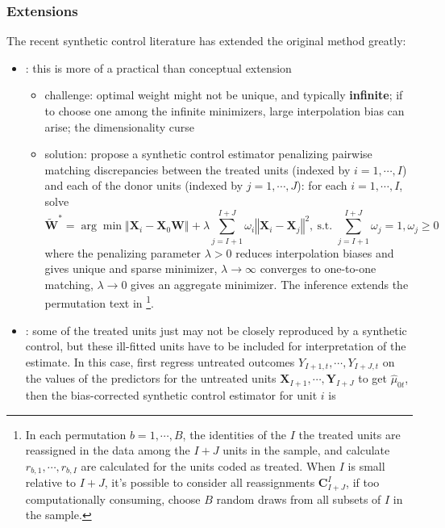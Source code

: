\documentclass[twoside]{article}
\begin{document}
\subsubsection{Extensions}
The recent synthetic control literature has extended the original method greatly:
\begin{itemize}
    \item {}: this is more of a practical than conceptual extension
    \begin{itemize}
        \item challenge: optimal weight might not be unique, and typically \textbf{infinite}; if to choose one among the infinite minimizers, large interpolation bias can arise; the dimensionality curse 
        \item solution: \citet{abadie2021penalized} propose a synthetic control estimator penalizing pairwise matching discrepancies between the treated units (indexed by $i=1,\cdots,I$) and each of the donor units (indexed by $j=1,\cdots,J$): for each $i=1,\cdots,I$, solve $$ \tilde{\mathbf{W}}^* = \arg\min \left\Vert \mathbf{X}_i-\mathbf{X}_0\mathbf{W} \right\Vert +\lambda \sum^{I+J}_{j=I+1}\omega_i\left\Vert \mathbf{X}_i - \mathbf{X}_j \right\Vert ^2 ,\ \text{s.t. }  \sum^{I+J}_{j=I+1}\omega_j =1,\omega_j\geq 0 $$
        where the penalizing parameter $\lambda>0$ reduces interpolation biases and gives unique and sparse minimizer, $\lambda \rightarrow \infty$ converges to one-to-one matching, $\lambda\rightarrow 0$ gives an aggregate minimizer. The inference extends the permutation text in \citet{abadie2010synthetic}\footnote{In each permutation $b=1,\cdots,B$, the identities of the $I$ the treated units are reassigned in the data among the $I+J$ units in the sample, and calculate $r_{b,1},\cdots,r_{b,I}$ are calculated for the units coded as treated. When $I$ is small relative to $I+J$, it's possible to consider all reassignments $\mathbf{C}^I_{I+J}$, if too computationally consuming, choose $B$ random draws from all subsets of $I$ in the sample.}.
    \end{itemize}
    \item {}: some of the treated units just may not be closely reproduced by a synthetic control, but these ill-fitted units have to be included for interpretation of the estimate. In this case, first regress untreated outcomes $Y_{I+1,t},\cdots,Y_{I+J,t}$ on the values of the predictors for the untreated units $\mathbf{X}_{I+1},\cdots,\mathbf{Y}_{I+J}$ to get $\hat{\mu}_{0t}$, then the bias-corrected synthetic control estimator for unit $i$ is 

\end{itemize}
\end{document}
